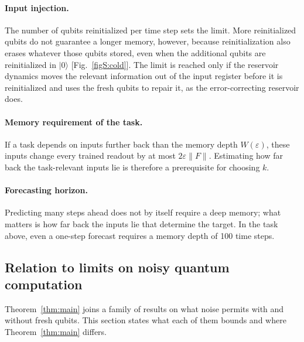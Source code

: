 \documentclass[aps,prl,twocolumn,superscriptaddress,floatfix]{revtex4-2}
\theoremstyle{plain}
\newcommand{\ket}[1]{|#1\rangle}
\newcommand{\Norm}[1]{\lVert #1\rVert}
\begin{document}
\paragraph*{Input injection.} The number of qubits reinitialized per time step sets the limit. More reinitialized qubits do not guarantee a longer memory, however, because reinitialization also erases whatever those qubits stored, even when the additional qubits are reinitialized in $\ket0$ [Fig.~\ref{figS:cold}]. The limit is reached only if the reservoir dynamics moves the relevant information out of the input register before it is reinitialized and uses the fresh qubits to repair it, as the error-correcting reservoir does.

\paragraph*{Memory requirement of the task.} If a task depends on inputs further back than the memory depth $W(\varepsilon)$, these inputs change every trained readout by at most $2\varepsilon\Norm F$. Estimating how far back the task-relevant inputs lie is therefore a prerequisite for choosing $k$.

\paragraph*{Forecasting horizon.} Predicting many steps ahead does not by itself require a deep memory; what matters is how far back the inputs lie that determine the target. In the task above, even a one-step forecast requires a memory depth of 100 time steps.

\subsection{Relation to limits on noisy quantum computation}
\label{sm:prior}

Theorem~\ref{thm:main} joins a family of results on what noise permits with and without fresh qubits. This section states what each of them bounds and where Theorem~\ref{thm:main} differs.
\end{document}
